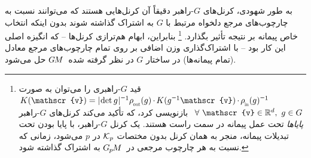 به طور شهودی، کرنل‌های $G$-راهبر دقیقاً آن کرنل‌هایی هستند که می‌توانند نسبت به چارچوب‌های مرجع دلخواه مرتبط با $G$ به اشتراک گذاشته شوند بدون اینکه انتخاب خاص پیمانه بر نتیجه تأثیر بگذارد.%
\footnote{
	قید $G$-راهبری را می‌توان به صورت
	${K(\mathscr{v}) = \detg^{\minus1} \rhoout(g) \mkern-1mu\cdot\mkern-1.5mu K(g^{\minus1}\mathscr{v}) \mkern-1mu\cdot\mkern-1.5mu \rhoin(g)^{\minus1}}$
	$\mkern8mu \forall\ \mathscr{v} \in \R^d,\ g\in G$
	بازنویسی کرد، که تأکید می‌کند کرنل‌های $G$-راهبر \emph{پایاها} تحت عمل پیمانه در سمت راست هستند.
	یک کرنل $G$-راهبر، با پایا بودن تحت تبدیلات پیمانه، منجر به همان کرنل بدون مختصات $\mathcal{K}_p$ در $p$ می‌شود، زمانی که نسبت به هر چارچوب مرجعی در~$G_{\mkern-1.3mu p}\mkern-1.2muM$ به اشتراک گذاشته شود.
}
بنابراین، ابهام هم‌ترازی کرنل‌ها -- که انگیزه اصلی این کار بود -- با اشتراک‌گذاری وزن اضافی بر روی تمام چارچوب‌های مرجع معادل (تمام پیمانه‌ها) در ساختار $G$ در نظر گرفته شده~$G\mkern-1.4muM$ حل می‌شود.

